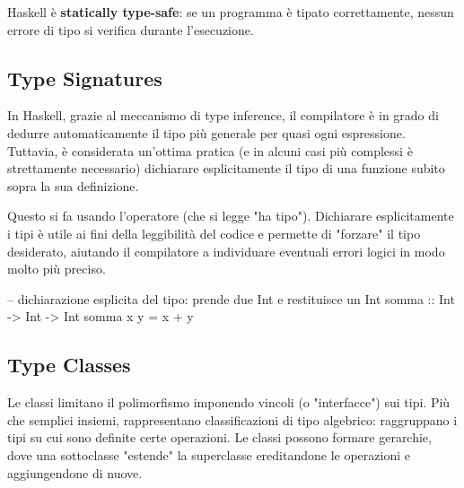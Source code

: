 Haskell è \textbf{statically type-safe}: se un programma è tipato correttamente, nessun errore di tipo si verifica durante l’esecuzione.

\subsection{Type Signatures}
In Haskell, grazie al meccanismo di type inference, il compilatore è in grado di dedurre automaticamente il tipo più generale per quasi ogni espressione. Tuttavia, è considerata un'ottima pratica (e in alcuni casi più complessi è strettamente necessario) dichiarare esplicitamente il tipo di una funzione subito sopra la sua definizione. 

Questo si fa usando l'operatore \code{::} (che si legge "ha tipo"). Dichiarare esplicitamente i tipi è utile ai fini della leggibilità del codice e permette di "forzare" il tipo desiderato, aiutando il compilatore a individuare eventuali errori logici in modo molto più preciso.

\begin{haskellbox}{}
-- dichiarazione esplicita del tipo: prende due Int e restituisce un Int
somma :: Int -> Int -> Int
somma x y = x + y
\end{haskellbox}

\subsection{Type Classes}
Le classi limitano il polimorfismo imponendo vincoli (o "interfacce") sui tipi. Più che semplici insiemi, rappresentano classificazioni di tipo algebrico: raggruppano i tipi su cui sono definite certe operazioni. Le classi possono formare gerarchie, dove una sottoclasse "estende" la superclasse ereditandone le operazioni e aggiungendone di nuove.

